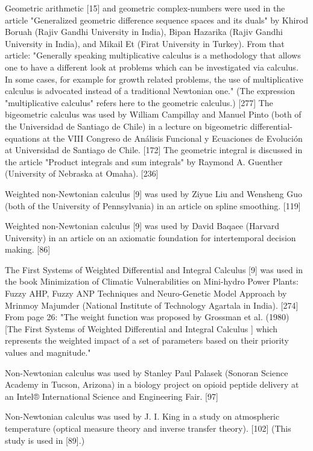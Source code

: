 \documentclass[12pt]{article}
\begin{document}
Geometric arithmetic [15] and geometric complex-numbers were used in the article "Generalized geometric difference sequence spaces and its duals" by Khirod Boruah (Rajiv Gandhi University in India), Bipan Hazarika (Rajiv Gandhi University in India), and Mikail Et (Firat University in Turkey). From that article: "Generally speaking multiplicative calculus is a methodology that allows one to have a different look at problems which can be investigated via calculus. In some cases, for example for growth related problems, the use of multiplicative calculus is advocated instead of a traditional Newtonian one." (The expression "multiplicative calculus" refers here to the geometric calculus.) [277]
The bigeometric calculus was used by William Campillay and Manuel Pinto (both of the Universidad de Santiago de Chile) in a lecture on bigeometric differential-equations at the VIII Congreso de Análisis Funcional y Ecuaciones de Evolución at Universidad de Santiago de Chile. [172]
The geometric integral is discussed in the article "Product integrals and sum integrals" by Raymond A. Guenther (University of Nebraska at Omaha). [236]

Weighted non-Newtonian calculus [9] was used by Ziyue Liu and Wensheng Guo (both of the University of Pennsylvania) in an article on spline smoothing. [119]

Weighted non-Newtonian calculus [9] was used by David Baqaee (Harvard University) in an article on an axiomatic foundation for intertemporal decision making. [86]

The First Systems of Weighted Differential and Integral Calculus [9] was used in the book Minimization of Climatic Vulnerabilities on Mini-hydro Power Plants: Fuzzy AHP, Fuzzy ANP Techniques and Neuro-Genetic Model Approach by Mrinmoy Majumder (National Institute of Technology Agartala in India). [274] From page 26: "The weight function was proposed by Grossman et al. (1980) [The First Systems of Weighted Differential and Integral Calculus ] which represents the weighted impact of a set of parameters based on their priority values and magnitude."  

Non-Newtonian calculus was used by Stanley Paul Palasek (Sonoran Science Academy in Tucson, Arizona) in a biology project on opioid peptide delivery at an Intel® International Science and Engineering Fair. [97]

Non-Newtonian calculus was used by J. I. King in a study on atmospheric temperature (optical measure theory and inverse transfer theory). [102] (This study is used in [89].)
\end{document}
